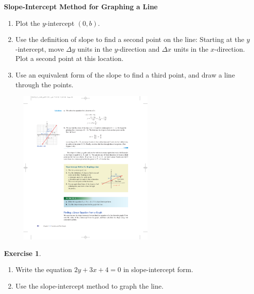 \documentclass[10pt,]{book}
\theoremstyle{plain}
\theoremstyle{definition}
\theoremstyle{definition}
\theoremstyle{definition}
\theoremstyle{definition}
\newtheorem{exercise}[theorem]{Exercise}
\numberwithin{equation}{section}
\begin{document}
\begin{mdframed}[style=assemblage]%
\noindent\textbf{\large Slope-Intercept Method for Graphing a Line}\label{assemblage-15}\par\medskip

\leavevmode%
\begin{enumerate}[label=*\alph**]
\item\hypertarget{li-168}{}Plot the \(y\)-intercept \((0, b)\).\item\hypertarget{li-169}{}Use the definition of slope to find a second point on the line: Starting at the \(y\)-intercept, move \(\Delta y\) units in the \(y\)-direction and \(\Delta x\) units in the \(x\)-direction. Plot a second point at this location.\item\hypertarget{li-170}{}Use an equivalent form of the slope to find a third point, and draw a line through the points.\end{enumerate}

\leavevmode%
\begin{figure}
\centering
\includegraphics[width=0.60\textwidth,]{images/fig-slope-intercept0.pdf}\caption{\label{fig-slope-intercept0}}
\end{figure}
%
\end{mdframed}
\begin{exercise}\label{exercise-slope-intercept}
\leavevmode%
\begin{enumerate}[label=*\alph**]
\item\hypertarget{li-171}{}Write the equation \(2y + 3x + 4 = 0\) in slope-intercept form.\item\hypertarget{li-172}{}Use the slope-intercept method to graph the line.\end{enumerate}
\end{exercise}
\typeout{************************************************}
\typeout{************************************************}
\end{document}
